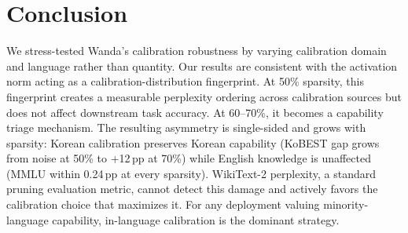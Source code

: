 \documentclass{article}
\begin{document}
\section{Conclusion}

We stress-tested Wanda's calibration robustness by varying calibration domain and language rather than quantity.
Our results are consistent with the activation norm acting as a calibration-distribution fingerprint.
At 50\% sparsity, this fingerprint creates a measurable perplexity ordering across calibration sources but does not affect downstream task accuracy.
At 60--70\%, it becomes a capability triage mechanism.
The resulting asymmetry is single-sided and grows with sparsity: Korean calibration preserves Korean capability (KoBEST gap grows from noise at 50\% to +12\,pp at 70\%) while English knowledge is unaffected (MMLU within 0.24\,pp at every sparsity).
WikiText-2 perplexity, a standard pruning evaluation metric, cannot detect this damage and actively favors the calibration choice that maximizes it.
For any deployment valuing minority-language capability, in-language calibration is the dominant strategy.
\end{document}
